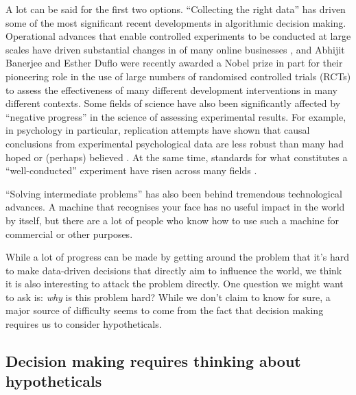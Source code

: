 A lot can be said for the first two options. ``Collecting the right data'' has driven some of the most significant recent developments in algorithmic decision making. Operational advances that enable controlled experiments to be conducted at large scales have driven substantial changes in of many online businesses \citep{kohavi_surprising_2017}, and Abhijit Banerjee and Esther Duflo were recently awarded a Nobel prize in part for their pioneering role in the use of large numbers of randomised controlled trials (RCTs) to assess the effectiveness of many different development interventions in many different contexts\citep{zhang_abdul_2014}. Some fields of science have also been significantly affected by ``negative progress'' in the science of assessing experimental results. For example, in psychology in particular, replication attempts have shown that causal conclusions from experimental psychological data are less robust than many had hoped or (perhaps) believed \citet{open_science_collaboration_estimating_2015,stroebe_what_2019}. At the same time, standards for what constitutes a ``well-conducted'' experiment have risen across many fields \citep{nosek_preregistration_2018,liberati_prisma_2009}.

``Solving intermediate problems'' has also been behind tremendous technological advances. A machine that recognises your face has no useful impact in the world by itself, but there are a lot of people who know how to use such a machine for commercial or other purposes.

While a lot of progress can be made by getting around the problem that it's hard to make data-driven decisions that directly aim to influence the world, we think it is also interesting to attack the problem directly. One question we might want to ask is: \emph{why} is this problem hard? While we don't claim to know for sure, a major source of difficulty seems to come from the fact that decision making requires us to consider hypotheticals.

\subsection[Hypotheticals]{Decision making requires thinking about hypotheticals}\label{sec:assumptions}

